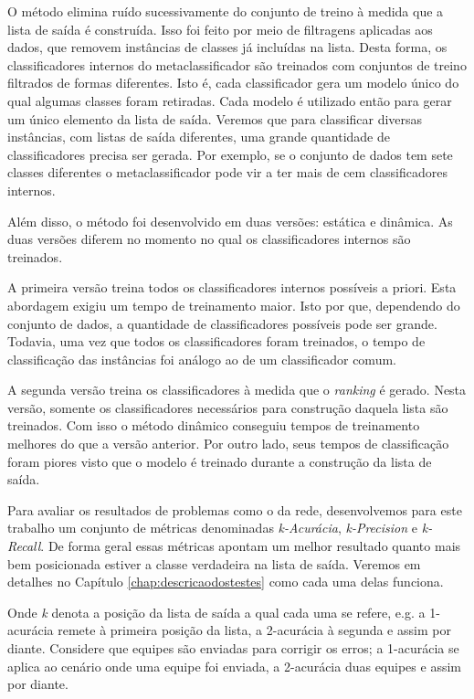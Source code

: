 O método elimina ruído sucessivamente do conjunto de treino à medida que a lista de saída é construída.
Isso foi feito por meio de filtragens aplicadas aos dados, que removem instâncias de classes já incluídas na lista.
Desta forma, os classificadores internos do metaclassificador são treinados com conjuntos de treino filtrados de formas diferentes.
Isto é, cada classificador gera um modelo único do qual algumas classes foram retiradas.
Cada modelo é utilizado então para gerar um único elemento da lista de saída.
Veremos que para classificar diversas instâncias, com listas de saída diferentes, uma grande quantidade de classificadores precisa ser gerada.
Por exemplo, se o conjunto de dados tem sete classes diferentes o metaclassificador pode vir a ter mais de cem classificadores internos.

Além disso, o método foi desenvolvido em duas versões: estática e dinâmica.
As duas versões diferem no momento no qual os classificadores internos são treinados.

A primeira versão treina todos os classificadores internos possíveis a priori.
Esta abordagem exigiu um tempo de treinamento maior.
Isto por que, dependendo do conjunto de dados, a quantidade de classificadores possíveis pode ser grande.
Todavia, uma vez que todos os classificadores foram treinados, o tempo de classificação das instâncias foi análogo ao de um classificador comum.

A segunda versão treina os classificadores à medida que o \textit{ranking} é gerado.
Nesta versão, somente os classificadores necessários para construção daquela lista são treinados.
Com isso o método dinâmico conseguiu tempos de treinamento melhores do que a versão anterior.
Por outro lado, seus tempos de classificação foram piores visto que o modelo é treinado durante a construção da lista de saída.

Para avaliar os resultados de problemas como o da rede, desenvolvemos para este trabalho um conjunto de métricas denominadas \textit{k-Acurácia}, \textit{k-Precision} e \textit{k-Recall}.
De forma geral essas métricas apontam um melhor resultado quanto mais bem posicionada estiver a classe verdadeira na lista de saída.
Veremos em detalhes no Capítulo \ref{chap:descricaodostestes} como cada uma delas funciona.

Onde \textit{k} denota a posição da lista de saída a qual cada uma se refere, e.g. a 1-acurácia remete à primeira posição da lista, a 2-acurácia à segunda e assim por diante.
Considere que equipes são enviadas para corrigir os erros; a 1-acurácia se aplica ao cenário onde uma equipe foi enviada, a 2-acurácia duas equipes e assim por diante.

